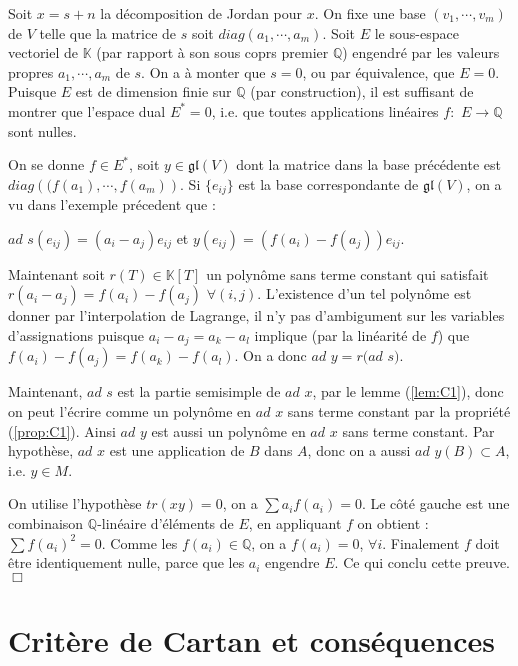 \documentclass[a4paper,openany,12pt]{report}
\newcommand{\KK}{\mathbb{K}}
\newcommand{\QQ}{\mathbb{Q}}
\newcommand{\gl}{\mathfrak{gl}}
\theoremstyle{break}
{\theorembodyfont{\upshape}
\newtheorem*{rmq}{Remarque :}
\newtheorem*{prv}{Preuve :}
\newtheorem*{ex}{Exemples :}
\newtheorem*{exe}{Exemple : }
\newtheorem*{nota}{Notation :}
\newtheorem*{dem}{D\'emonstration :}}
\begin{document}
\begin{prv}
\quad Soit $x=s+n$ la décomposition de Jordan pour $x$. On fixe une base $(v_{1},\cdots,v_{m})$ de $V$ telle que la matrice de $s$ soit $diag(a_{1}, \cdots,a_{m})$. Soit $E$ le sous-espace vectoriel de $\KK$ (par rapport à son sous coprs premier $\QQ$) engendré par les valeurs propres $a_{1},\cdots,a_{m}$ de $s$. On a à monter que $s=0$, ou par équivalence, que $E=0$. Puisque $E$ est de dimension finie sur $\QQ$ (par construction), il est suffisant de montrer que l'espace dual $E^{*}=0$, i.e. que toutes applications linéaires $f:$ $E \to \QQ$ sont nulles. 

On se donne $f \in E^{*}$, soit $y \in \gl(V)$ dont la matrice dans la base précédente est $diag\left( (f(a_{1}),\cdots,f(a_{m}) \right)$. Si $\{ e_{ij} \}$ est la base correspondante de $\gl(V)$, on a vu dans l'exemple précedent que :
\begin{center}
$ad$ $s(e_{ij}) = (a_{i} - a_{j})e_{ij}$ et $y(e_{ij}) = (f(a_{i})-f(a_{j}))e_{ij}$.
\end{center}
Maintenant soit $r(T) \in \KK[T]$ un polynôme sans terme constant qui satisfait $r(a_{i}-a_{j}) = f(a_{i})-f(a_{j})$ $\forall (i,j)$. L’existence d'un tel polynôme est donner par l’interpolation de Lagrange, il n'y pas d’ambigument sur les variables d'assignations puisque $a_{i} - a_{j} = a_{k} -a_{l}$ implique (par la linéarité de $f$) que $f(a_{i}) - f(a_{j}) = f(a_{k}) -f(a_{l})$. On a donc $ad$ $y= r(ad$ $s)$.

Maintenant, $ad$ $s$ est la partie semisimple de $ad$ $x$, par le lemme (\ref{lem:C1}), donc on peut l'écrire comme un polynôme en $ad$ $x$ sans terme constant par la propriété (\ref{prop:C1}). Ainsi $ad$ $y$ est aussi un polynôme en $ad$ $x$ sans terme constant. Par hypothèse, $ad$ $x$ est une application de $B$ dans $A$, donc on a aussi $ad$ $y(B) \subset A$, i.e. $y \in M$.

On utilise l'hypothèse $tr(xy)=0$, on a $\sum a_{i}f(a_{i}) = 0$. Le côté gauche est une combinaison $\QQ$-linéaire d'éléments de $E$, en appliquant $f$ on obtient : $\sum f(a_{i})^2 = 0$. Comme les $f(a_{i}) \in \QQ$, on a $f(a_{i})=0$, $\forall i$. Finalement $f$ doit être identiquement nulle, parce que les $a_{i}$ engendre $E$. Ce qui conclu cette preuve. $\Box$
\end{prv}

\section{Critère de Cartan et conséquences}
\end{document}
